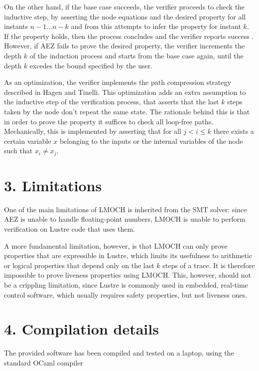 \documentclass[11pt]{article}
\begin{document}
On the other hand, if the base case succeeds, the verifier proceeds to check the inductive step, by asserting
the node equations and the desired property for all instants $n - 1 \dots n - k$ and from this attempts to infer
the property for instant $k$. If the property holds, then the process concludes and the verifier reports success
. However, if AEZ fails to prove the desired property, the verifier increments the depth $k$ of the induction
process and starts from the base case again, until the depth $k$ excedes the bound specified by the user.

As an optimization, the verifier implements the path compression strategy described in Hagen and Tinelli. 
This optimization adds an extra assumption to the inductive step of the verification process, that asserts that
the last $k$ steps taken by the node don't repeat the same state. The rationale behind this is that in order
to prove the property it suffices to check all loop-free paths. Mechanically, this is implemented by asserting
that for all $j < i \leq k$ there exists a certain variable $x$ belonging to the inputs or the internal
variables of the node such that $x_i \neq x_j$. 

\section{3. Limitations}
One of the main limitations of LMOCH is inherited from the SMT solver: since AEZ is unable to handle 
floating-point numbers, LMOCH is unable to perform verification on Lustre code that uses them. 

A more fundamental limitation, however, is that LMOCH can only prove properties that are expressible in Lustre,
which limits its usefulness to arithmetic or logical properties that depend only on the last $k$ steps of a 
trace. It is therefore impossible to prove liveness properties using LMOCH. This, however, should not be a
crippling limitation, since Lustre is commonly used in embedded, real-time control software, which usually
requires safety properties, but not liveness ones.

\section{4. Compilation details}
The provided software has been compiled and tested on a  laptop, using the standard
OCaml compiler 
\end{document}
